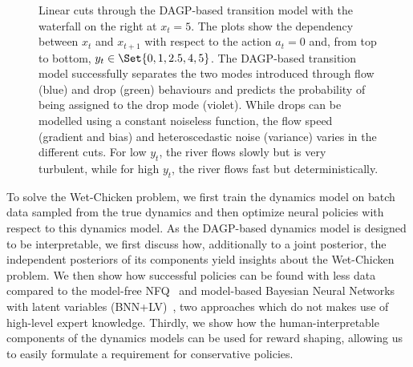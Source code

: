 \begin{figure}[tp]
    \centering
    
    
    
    
    
    \caption{
        \label{fig:interpretable_rl:wetchicken:cut}
        Linear cuts through the DAGP-based transition model with the waterfall on the right at $x_t = 5$.
        The plots show the dependency between $x_t$ and $x_{t+1}$ with respect to the action $a_t = 0$ and, from top to bottom, $y_t \in \Set{0, 1, 2.5, 4, 5}$.
        The DAGP-based transition model successfully separates the two modes introduced through flow (blue) and drop (green) behaviours and predicts the probability of being assigned to the drop mode (violet).
        While drops can be modelled using a constant noiseless function, the flow speed (gradient and bias) and heteroscedastic noise (variance) varies in the different cuts.
        For low $y_t$, the river flows slowly but is very turbulent, while for high $y_t$, the river flows fast but deterministically.
    }
\end{figure}
To solve the Wet-Chicken problem, we first train the dynamics model on batch data sampled from the true dynamics and then optimize neural policies with respect to this dynamics model.
As the DAGP-based dynamics model is designed to be interpretable, we first discuss how, additionally to a joint posterior, the independent posteriors of its components yield insights about the Wet-Chicken problem.
We then show how successful policies can be found with less data compared to the model-free NFQ~\parencite{riedmiller_neural_2005} and model-based Bayesian Neural Networks with latent variables (BNN+LV)~\parencite{depeweg_learning_2016}, two approaches which do not makes use of high-level expert knowledge.
Thirdly, we show how the human-interpretable components of the dynamics models can be used for reward shaping, allowing us to easily formulate a requirement for conservative policies.


